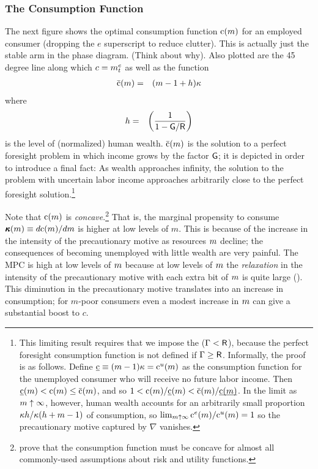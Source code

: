 \documentclass{handout}
\begin{document}
\subsubsection{The Consumption Function}
The next figure shows the optimal consumption function $\mathrm{c}(m)$ for an
employed consumer (dropping the $e$ superscript to reduce clutter).  This
is actually just the stable arm in the phase diagram.  (Think about
why).  Also plotted are the 45 degree line along which $c = m^{e}_{t}$
as well as the function
\begin{eqnarray}
  \bar{\mathrm{c}}(m) & = & (m-1+h)\kappa
\end{eqnarray}
where
\begin{eqnarray}
  h & = & \left(\frac{1}{1-\mathsf{G}/\mathsf{R}}\right)
\end{eqnarray}
is the level of (normalized) human wealth.  $\bar{\mathrm{c}}(m)$ is the
solution to a perfect foresight problem in which income 
grows by the factor $\mathsf{G}$; it is depicted in order to
introduce a final fact: As wealth approaches infinity, the solution
to the problem with uncertain labor income approaches arbitrarily
close to the perfect foresight solution.\footnote{This
  limiting result requires that we impose the \FHWCPGro ($\Gamma < \mathsf{R}$), because the perfect foresight consumption function is
  not defined if $\Gamma \geq \mathsf{R}$.  Informally, the proof is as follows.  Define $\underbar{\cFunc}\equiv (\mRat-1)\MPCU=\cFunc^{u}(\mRat)$ as the consumption function for the unemployed consumer who will receive no future labor income.  Then$\underbar{\cFunc}(\mRat) < \cFunc(\mRat) \leq \bar{\cFunc}(\mRat)$, and so $1 < \cFunc(\mRat)/\underbar{\cFunc}(\mRat)<\bar{\cFunc}(\mRat)/\underbar{\cFunc(\mRat)}$. In the limit as $m \uparrow \infty$, however, human wealth accounts for an arbitrarily small proportion $\kappa h/\kappa (h+m-1)$ of consumption, so $\lim_{m \uparrow \infty} \mathrm{c}^{e}(m)/\mathrm{c}^{u}(m) = 1$ so the precautionary motive captured by $\nabla$ vanishes.}

Note that $\mathrm{c}(m)$ is {\it concave}.\footnote{\cite{carroll&kimball:concavity} prove that the consumption
function must be concave for almost all commonly-used assumptions about
risk and utility functions.} That is, the marginal propensity to
consume $\pmb{\kappa}(m) \equiv d \mathrm{c}(m)/d m$ is higher at low levels of $m$.  This is because
of the increase in the intensity of the precautionary motive as resources
$m$ decline; the consequences of becoming unemployed with little wealth are very painful.  The MPC is high at low
levels of $m$ because at low levels of $m$ the {\it relaxation} in the
intensity of the precautionary motive with each extra bit of $m$ is quite large (\cite{kimball:smallandlarge}).
This diminution in the precautionary motive translates into an increase
in consumption; for $m$-poor consumers even a modest increase in $m$ can
give a substantial boost to $c$.
\end{document}
